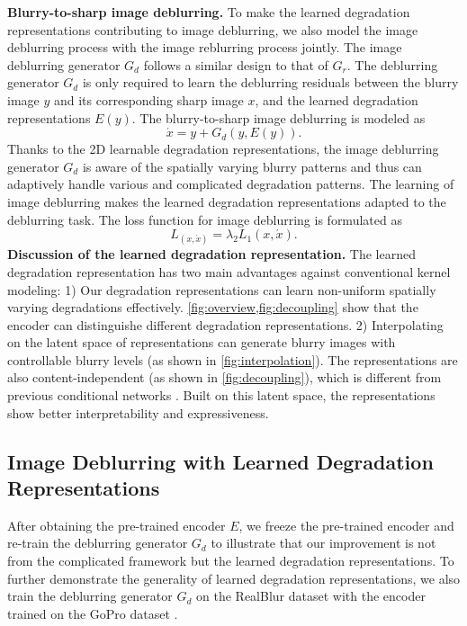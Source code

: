 \documentclass[runningheads]{llncs}
\begin{document}
\noindent\textbf{Blurry-to-sharp image deblurring.} To make the learned degradation representations contributing to image deblurring, we also model the image deblurring process with the image reblurring process jointly. 
The image deblurring generator $G_d$ follows a similar design to that of $G_r$. The deblurring generator $G_d$ is only required to learn the deblurring residuals between the blurry image $y$ and its corresponding sharp image $x$, and the learned degradation representations $E(y)$. The blurry-to-sharp image deblurring is modeled as
\begin{equation}
     \acute{x} = y + G_d(y, E(y)).
\end{equation}
Thanks to the 2D learnable degradation representations, the image deblurring generator $G_d$ is aware of the spatially varying blurry patterns and thus can adaptively handle various and complicated degradation patterns. The learning of image deblurring makes the learned degradation representations adapted to the deblurring task. The loss function for image deblurring is formulated as
\begin{equation}
    L_(x, \acute{x}) = \lambda_2 L_1(x, \acute{x}).
\end{equation}
\noindent\textbf{Discussion of the learned degradation representation.}
The learned degradation representation has two main advantages against conventional kernel modeling: 1) Our degradation representations can learn non-uniform spatially varying degradations effectively. 
\cref{fig:overview,fig:decoupling} show that the encoder can distinguishe different degradation representations. 
2) Interpolating on the latent space of representations can generate blurry images with controllable blurry levels (as shown in \cref{fig:interpolation}). The representations are also content-independent (as shown in \cref{fig:decoupling}), which is different from previous conditional networks \cite{wang2018sftgan,spatially_variant_recurrent,zhou2019stfan}. Built on this latent space, the representations show better interpretability and expressiveness.

\subsection{Image Deblurring with Learned Degradation Representations}
After obtaining the pre-trained encoder $E$, we freeze the pre-trained encoder and re-train the deblurring generator $G_d$ to illustrate that our improvement is not from the complicated framework but the learned degradation representations. To further demonstrate the generality of learned degradation representations, we also train the deblurring generator $G_d$ on the RealBlur dataset \cite{realblur} with the encoder trained on the GoPro dataset \cite{deblur-multi-scale}.
\end{document}
